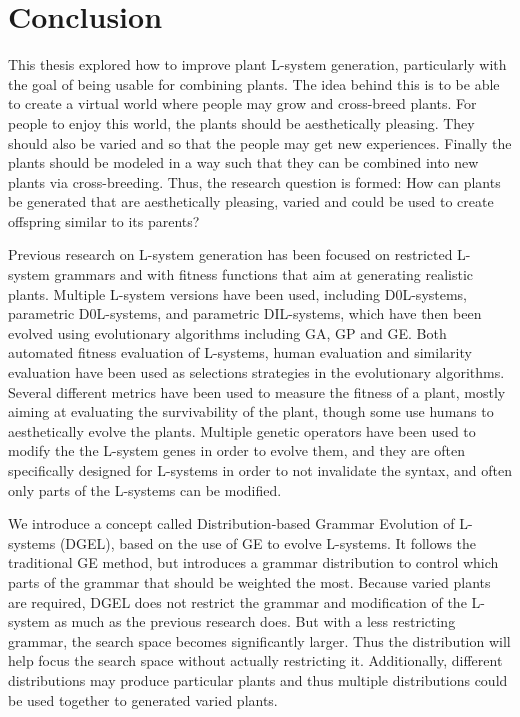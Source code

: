 \chapter{Conclusion}

This thesis explored how to improve plant L-system generation, particularly with the goal of being usable for combining plants.
The idea behind this is to be able to create a virtual world where people may grow and cross-breed plants.
For people to enjoy this world, the plants should be aesthetically pleasing.
They should also be varied and so that the people may get new experiences.
Finally the plants should be modeled in a way such that they can be combined into new plants via cross-breeding.
Thus, the research question is formed: How can plants be generated that are aesthetically pleasing, varied and could be used to create offspring similar to its parents?

Previous research on L-system generation has been focused on restricted L-system grammars and with fitness functions that aim at generating realistic plants.
Multiple L-system versions have been used, including D0L-systems, parametric D0L-systems, and parametric DIL-systems, which have then been evolved using evolutionary algorithms including GA, GP and GE.
Both automated fitness evaluation of L-systems, human evaluation and similarity evaluation have been used as selections strategies in the evolutionary algorithms.
Several different metrics have been used to measure the fitness of a plant, mostly aiming at evaluating the survivability of the plant, though some use humans to aesthetically evolve the plants.
Multiple genetic operators have been used to modify the the L-system genes in order to evolve them, and they are often specifically designed for L-systems in order to not invalidate the syntax, and often only parts of the L-systems can be modified.

We introduce a concept called Distribution-based Grammar Evolution of L-systems (DGEL), based on the use of GE to evolve L-systems. %
It follows the traditional GE method, %
but introduces a grammar distribution to control which parts of the grammar that should be weighted the most.
Because varied plants are required, DGEL does not restrict the grammar and modification of the L-system as much as the previous research does.
But with a less restricting grammar, the search space becomes significantly larger.
Thus the distribution will help focus the search space without actually restricting it.
Additionally, different distributions may produce particular plants and thus multiple distributions could be used together to generated varied plants.

